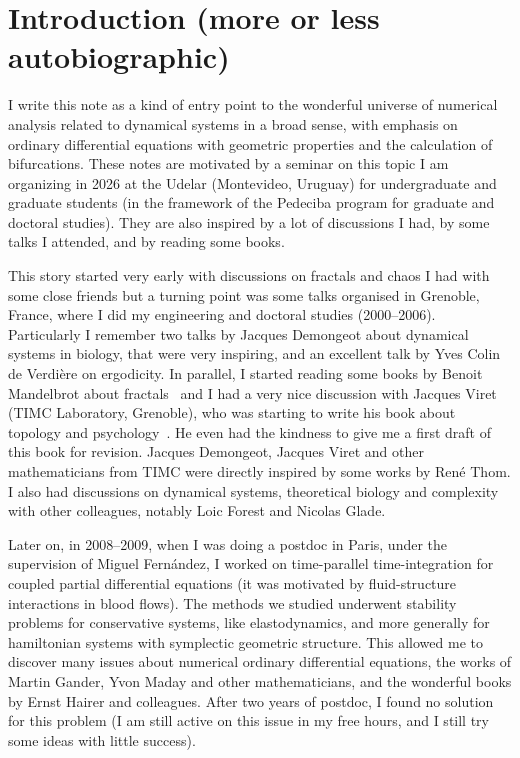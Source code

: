 \documentclass[11pt]{article}
\begin{document}
\section{Introduction (more or less autobiographic)}

I write this note as a kind of entry point to the wonderful universe of numerical analysis related to dynamical systems in a broad sense, with emphasis on ordinary differential equations with geometric properties and the calculation of bifurcations. These notes are motivated by a seminar on this topic I am organizing in 2026 at the Udelar (Montevideo, Uruguay) for undergraduate and graduate students (in the framework of the Pedeciba program for graduate and doctoral studies). They are also inspired by a lot of discussions I had, by some talks I attended, and by reading some books.

\medskip

This story started very early with discussions on fractals and chaos I had with some close friends %
but a turning point was some talks organised in Grenoble, France, where I did my engineering and doctoral studies (2000--2006). Particularly I remember two talks by Jacques Demongeot about dynamical systems in biology, that  were very inspiring, and an excellent talk by Yves Colin de Verdi\`ere on ergodicity. In parallel, I started reading some books by Benoit Mandelbrot about fractals~\cite{mandelbrot} and I had a very nice discussion with Jacques Viret (TIMC Laboratory, Grenoble), who was starting to write his book about topology and psychology~\cite{viret}. He even had the kindness to give me a first draft of this book for revision. Jacques Demongeot, Jacques Viret and other mathematicians from TIMC were directly inspired by some works by Ren\'e Thom.
I also had discussions on dynamical systems, theoretical biology and complexity with other colleagues, notably Loic Forest and Nicolas Glade.

\medskip

Later on, in 2008--2009, when I was doing a postdoc in Paris, under the supervision of Miguel Fern\'andez, I worked on time-parallel time-integration for coupled partial differential equations (it was motivated by fluid-structure interactions in blood flows). The methods we studied underwent stability problems for conservative systems, like elastodynamics, and more generally for hamiltonian systems with symplectic geometric structure. This allowed me to discover many issues about numerical ordinary differential equations, the works of Martin Gander, Yvon Maday and other mathematicians, and the wonderful books by Ernst Hairer and colleagues. After two years of postdoc, I found no solution for this problem (I am still active on this issue in my free hours, and I still try some ideas with little success).
\end{document}
